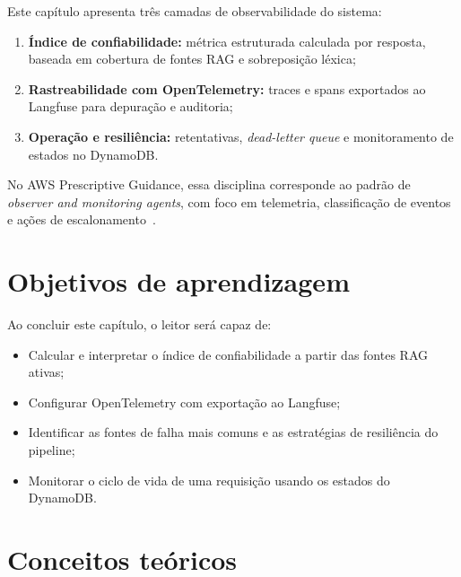 Este cap\'itulo apresenta tr\^es camadas de observabilidade do sistema:

\begin{enumerate}[leftmargin=*]
  \item \textbf{\'Indice de confiabilidade:} m\'etrica estruturada
        calculada por resposta, baseada em cobertura de fontes RAG
        e sobreposi\c{c}\~ao l\'exica;
  \item \textbf{Rastreabilidade com OpenTelemetry:} traces e spans
        exportados ao Langfuse para depura\c{c}\~ao e auditoria;
  \item \textbf{Oper\-a\c{c}\~ao e resili\^encia:} retentativas,
        \textit{dead-letter queue} e monitoramento de estados no
        DynamoDB.
\end{enumerate}

No AWS Prescriptive Guidance, essa disciplina corresponde ao padr\~ao de
\textit{observer and monitoring agents}, com foco em telemetria, classifica\c{c}\~ao
de eventos e a\c{c}\~oes de escalonamento~\cite{awsagentic2025}.

\section{Objetivos de aprendizagem}

Ao concluir este cap\'itulo, o leitor ser\'a capaz de:

\begin{itemize}[leftmargin=*]
  \item Calcular e interpretar o \'indice de confiabilidade a partir
        das fontes RAG ativas;
  \item Configurar OpenTelemetry com exporta\c{c}\~ao ao Langfuse;
  \item Identificar as fontes de falha mais comuns e as estrat\'egias
        de resili\^encia do pipeline;
  \item Monitorar o ciclo de vida de uma requisi\c{c}\~ao usando os
        estados do DynamoDB.
\end{itemize}

\section{Conceitos te\'oricos}

